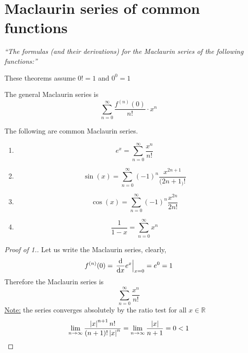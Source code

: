 \documentclass[12pt]{report}
\begin{document}
    \section{Maclaurin series of common functions}
    \textit{``The formulas (and their derivations) for the Maclaurin series of the following functions:''}
    \sidebyside{\[e^x\]}{\[\sin(x)\]}
    \sidebyside{\[\cos(x)\]}{\[\frac{1}{1-x}\]} \vspace{3mm}
    \begin{theorem}
        These theorems assume \(0! = 1\) and \(0^0 = 1\)

        The general Maclaurin series is
        \[\sum^\infty_{n=0} \frac{f^{(n)}(0)}{n!} \cdot x^n\]

        The following are common Maclaurin series.
        \begin{enumerate}
            \item \[\hyperref[Maclaurin series 1]{e^x = \sum^\infty_{n=0} \frac{x^n}{n!}}\]
            \item \[\hyperref[Maclaurin series 2]{\sin(x) = \sum^\infty_{n=0} (-1)^n \frac{x^{2n+1}}{(2n+1_)!}}\]
            \item \[\hyperref[Maclaurin series 3]{\cos(x) = \sum^\infty_{n=0} (-1)^n \frac{x^{2n}}{2n!}}\]
            \item \[\hyperref[Maclaurin series 4]{\frac{1}{1-x} = \sum^\infty_{n=0} x^n}\]
        \end{enumerate}
    \end{theorem}
    \label{Maclaurin series 1}
    \begin{proof}[Proof of \textnormal{1.}]
        Let us write the Maclaurin series, clearly,
        \[f^{(n)} (0) = \, \frac{\mathrm{d}}{\mathrm{d} x} e^x \Big|_{x=0} = e^0 = 1\]
        Therefore the Maclaurin series is
        \[\sum^\infty_{n=0} \frac{x^n}{n!}\]
        \underline{Note:} the series converges absolutely by the ratio test for all \(x \in \mathbb{R}\)
        \[\lim_{n \to \infty} \frac{\left| x \right|^{n+1} n!}{(n+1)! \left| x \right|^n} = \lim_{n \to \infty} \frac{\left| x \right|}{n+1} = 0 < 1\]
    \end{proof}
    \label{Maclaurin series 2}
\end{document}
